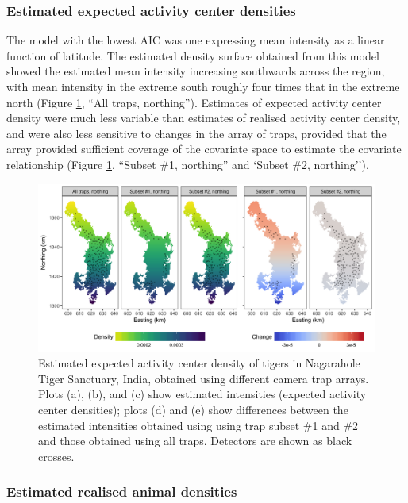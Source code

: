\documentclass[a4paper,12pt]{article}
\begin{document}
\subsubsection{Estimated expected activity center densities}

The model with the lowest AIC was one expressing mean intensity as a linear function of latitude. The estimated density surface obtained from this model showed the estimated mean intensity increasing southwards across the region, with mean intensity in the extreme south roughly four times that in the extreme north (Figure \ref{tigercov}, ``All traps, northing''). Estimates of expected activity center density were much less variable than estimates of realised activity center density, and were also less sensitive to changes in the array of traps, provided that the array provided sufficient coverage of the covariate space to estimate the covariate relationship (Figure \ref{tigercov}, ``Subset \#1, northing'' and `Subset \#2, northing''). 

\begin{figure}[htbp]
\centering
\includegraphics[width=1\textwidth]{tiger_surfaces_covs.png}
\caption{Estimated expected activity center density of tigers in Nagarahole Tiger Sanctuary, India, obtained using different camera trap arrays. Plots (a), (b), and (c) show estimated intensities (expected activity center densities); plots (d) and (e) show differences between the estimated intensities obtained using using trap subset \#1 and \#2 and those obtained using all traps. Detectors are shown as black crosses.}
\label{tigercov}
\end{figure}

\subsubsection{Estimated realised animal densities}
\end{document}
